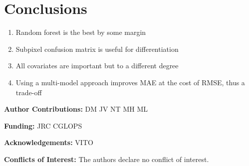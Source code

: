 \documentclass[a4paper,10pt]{article}
\newcommand{\minisection}[1]{\medskip \textbf{#1:}}
\begin{document}
\section{Conclusions}

\begin{enumerate}
 \item Random forest is the best by some margin
 \item Subpixel confusion matrix is useful for differentiation
 \item All covariates are important but to a different degree
 \item Using a multi-model approach improves MAE at the cost of RMSE, thus a trade-off
\end{enumerate}

\minisection{Author Contributions} DM JV NT MH ML

\minisection{Funding} JRC CGLOPS

\minisection{Acknowledgements} VITO

\minisection{Conflicts of Interest} The authors declare no conflict of interest.


\printnoidxglossary[type=acronym]
\end{document}
